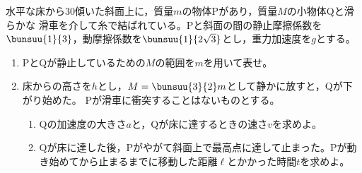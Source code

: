 \item
\begin{mawarikomi}{110pt}{}
    水平な床から30\Deg 傾いた斜面上に，質量$m$の物体Pがあり，質量$M$の小物体Qと滑らかな
    滑車を介して糸で結ばれている。Pと斜面の間の静止摩擦係数を$\bunsuu{1}{3}$，動摩擦係数を$\bunsuu{1}{2\sqrt{3}}$とし，重力加速度を$g$とする。
    \begin{enumerate}
        \item PとQが静止しているための$M$の範囲を$m$を用いて表せ。
        \item 床からの高さを$h$とし，$M=\bunsuu{3}{2}m$として静かに放すと，Qが下がり始めた。
        Pが滑車に衝突することはないものとする。
            \begin{enumerate}[(ア)]
                \item Qの加速度の大きさ$a$と，Qが床に達するときの速さ$v$を求めよ。
                \item Qが床に達した後，Pがやがて斜面上で最高点に達して止まった。Pが動き始めてから止まるまでに移動した距離$\ell $とかかった時間$t$を求めよ。
            \end{enumerate}
    \end{enumerate}
\end{mawarikomi}
